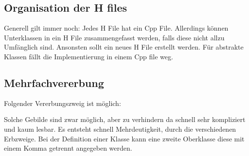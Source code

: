 

\subsection{Organisation der H files}

Generell gilt immer noch: Jedes H File hat ein Cpp File. 
Allerdings können Unterklassen in ein H File zusammengefasst werden, falls diese nicht allzu Umfänglich sind. 
Ansonsten sollt ein neues H File erstellt werden. 
Für abstrakte Klassen fällt die Implementierung in einem Cpp file weg.

\subsection{Mehrfachvererbung}

Folgender Vererbungszweig ist möglich:\\
\noindent
\begin{minipage}{0.5\columnwidth}
    \begin{center}
    \end{center}  
\end{minipage}
\begin{minipage}{0.5\columnwidth}
Solche Gebilde sind zwar möglich, aber zu verhindern da schnell sehr kompliziert und kaum lesbar. 
Es entsteht schnell Mehrdeutigkeit, durch die verschiedenen Erbzweige. 
Bei der Definition einer Klasse kann eine zweite Oberklasse diese mit einem Komma getrennt angegeben werden.

\end{minipage}


